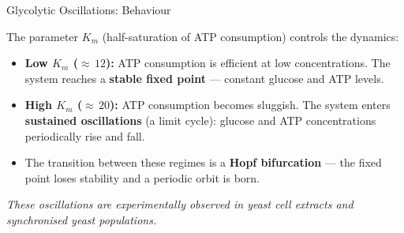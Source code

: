 \begin{frame}{Glycolytic Oscillations: Behaviour}

The parameter $K_m$ (half-saturation of ATP consumption) controls the dynamics:

\vspace{0.3cm}
\begin{itemize}
    \item \textbf{Low $K_m$ (${\approx}\,12$):} ATP consumption is efficient at low concentrations. The system reaches a \textbf{stable fixed point} --- constant glucose and ATP levels.

    \item \textbf{High $K_m$ (${\approx}\,20$):} ATP consumption becomes sluggish. The system enters \textbf{sustained oscillations} (a limit cycle): glucose and ATP concentrations periodically rise and fall.

    \item The transition between these regimes is a \textbf{Hopf bifurcation} --- the fixed point loses stability and a periodic orbit is born.
\end{itemize}

\vspace{0.3cm}
\textit{These oscillations are experimentally observed in yeast cell extracts and synchronised yeast populations.}
\end{frame}



